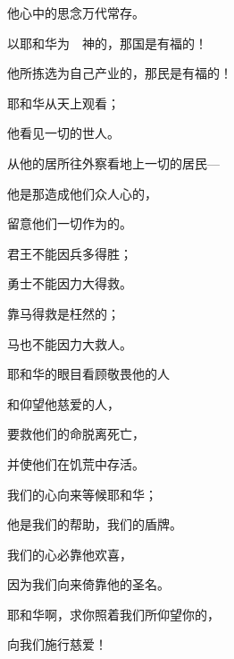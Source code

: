 {\par }{\Q 他心中的思念万代常存。
\par }{\Q {}以耶和华为　神的，那国是有福的！
\par }{\Q 他所拣选为自己产业的，那民是有福的！
\par }{\BB \par }{\Q {}耶和华从天上观看；
\par }{\Q 他看见一切的世人。
\par }{\Q {}从他的居所往外察看地上一切的居民—
\par }{\Q {}他是那造成他们众人心的，
\par }{\Q 留意他们一切作为的。
\par }{\Q {}君王不能因兵多得胜；
\par }{\Q 勇士不能因力大得救。
\par }{\Q {}靠马得救是枉然的；
\par }{\Q 马也不能因力大救人。
\par }{\BB \par }{\Q {}耶和华的眼目看顾敬畏他的人
\par }{\Q 和仰望他慈爱的人，
\par }{\Q {}要救他们的命脱离死亡，
\par }{\Q 并使他们在饥荒中存活。
\par }{\BB \par }{\Q {}我们的心向来等候耶和华；
\par }{\Q 他是我们的帮助，我们的盾牌。
\par }{\Q {}我们的心必靠他欢喜，
\par }{\Q 因为我们向来倚靠他的圣名。
\par }{\Q {}耶和华啊，求你照着我们所仰望你的，
\par }{\Q 向我们施行慈爱！

}
